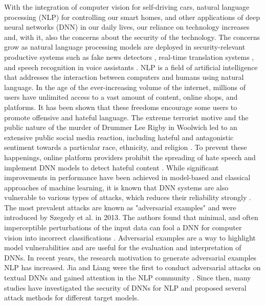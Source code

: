 With the integration of computer vision for self-driving cars, natural language processing (NLP) for controlling our smart homes, and other applications of deep neural networks (DNN) in our daily lives, our reliance on technology increases and, with it, also the concerns about the security of the technology. The concerns grow as natural language processing models are deployed in security-relevant productive systems such as fake news detectors \cite{singhania20173han}, real-time translation systems \cite{zhang2015deep}, and speech recognition in voice assistants \cite{deng2013new}. NLP is a field of artificial intelligence that addresses the interaction between computers and humans using natural language.  
In the age of the ever-increasing volume of the internet, millions of users have unlimited access to a vast amount of content, online shops, and platforms. It has been shown that these freedoms encourage some users to promote offensive and hateful language. The extreme terrorist motive and the public nature of the murder of Drummer Lee Rigby in Woolwich led to an extensive public social media reaction, including hateful and antagonistic sentiment towards a particular race, ethnicity, and religion \cite{burnap2014hate}.
To prevent these happenings, online platform providers prohibit the spreading of hate speech and implement DNN models to detect hateful content \cite{badjatiya2017deep}.
While significant improvements in performance have been achieved in model-based and classical approaches of machine learning, it is known that DNN systems are also vulnerable to various types of attacks, which reduces their reliability strongly \cite{papernot2018sok}. The most prevalent attacks are known as "adversarial examples" and were introduced by Szegedy et al. in 2013. The authors found that minimal, and often imperceptible perturbations of the input data can fool a DNN for computer vision into incorrect classifications \cite{szegedy2013intriguing}.
Adversarial examples are a way to highlight model vulnerabilities and are useful for the evaluation and interpretation of DNNs. 
In recent years, the research motivation to generate adversarial examples NLP has increased. Jia and Liang were the first to conduct adversarial attacks on textual DNNs and gained attention in the NLP community \cite{Jia2017AdversarialEF}. Since then, many studies have investigated the security of DNNs for NLP and proposed several attack methods for different target models. 

